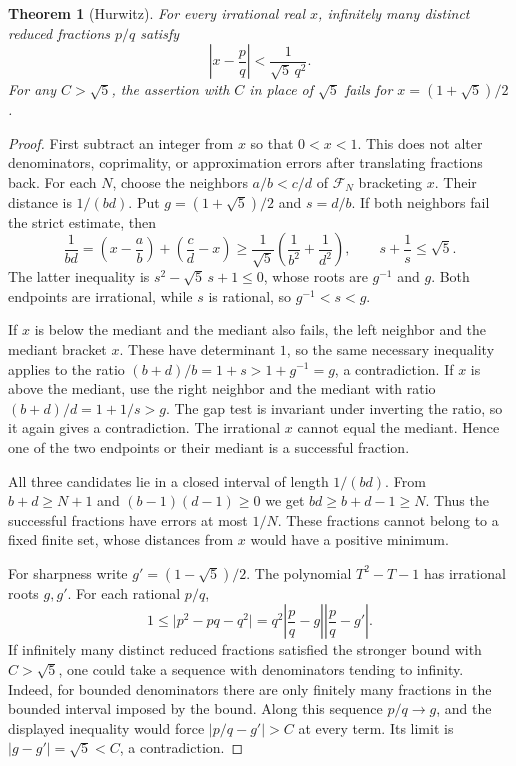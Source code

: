 \documentclass[11pt,oneside,openany]{book}
\theoremstyle{plain}
\newtheorem{theorem}{Theorem}[chapter]
\theoremstyle{definition}
\theoremstyle{remark}
\begin{document}
\begin{theorem}[Hurwitz]
For every irrational real \(x\), infinitely many distinct reduced
fractions \(p/q\) satisfy
\[
 \left|x-\frac pq\right|<\frac{1}{\sqrt5\,q^2}.
\]
For any \(C>\sqrt5\), the assertion with \(C\) in place of \(\sqrt5\)
fails for \(x=(1+\sqrt5)/2\).
\end{theorem}
\begin{proof}
First subtract an integer from \(x\) so that \(0<x<1\). This does not
alter denominators, coprimality, or approximation errors after
translating fractions back. For each \(N\), choose the neighbors
\(a/b<c/d\) of \(\mathcal F_N\) bracketing \(x\). Their distance is
\(1/(bd)\). Put \(g=(1+\sqrt5)/2\) and \(s=d/b\). If both neighbors
fail the strict estimate, then
\[
 \frac{1}{bd}
 =\left(x-\frac ab\right)+\left(\frac cd-x\right)
 \ge\frac1{\sqrt5}\left(\frac1{b^2}+\frac1{d^2}\right),
 \qquad
 s+\frac1s\le\sqrt5.
\]
The latter inequality is \(s^2-\sqrt5\,s+1\le0\), whose roots are
\(g^{-1}\) and \(g\). Both endpoints are irrational, while \(s\) is
rational, so \(g^{-1}<s<g\).

If \(x\) is below the mediant and the mediant also fails, the left
neighbor and the mediant bracket \(x\). These have determinant \(1\),
so the same necessary inequality applies to the ratio
\((b+d)/b=1+s>1+g^{-1}=g\), a contradiction. If \(x\) is above the
mediant, use the right neighbor and the mediant with ratio
\((b+d)/d=1+1/s>g\). The gap test is invariant under inverting the
ratio, so it again gives a contradiction. The irrational \(x\) cannot
equal the mediant. Hence one of the two endpoints or their mediant is
a successful fraction.

All three candidates lie in a closed interval of length \(1/(bd)\).
From \(b+d\ge N+1\) and \((b-1)(d-1)\ge0\) we get
\(bd\ge b+d-1\ge N\). Thus the successful fractions have errors at
most \(1/N\). These fractions cannot belong to a fixed finite set,
whose distances from \(x\) would have a positive minimum.

For sharpness write \(g'=(1-\sqrt5)/2\). The polynomial
\(T^2-T-1\) has irrational roots \(g,g'\). For each rational \(p/q\),
\[
 1\le \lvert p^2-pq-q^2\rvert
 =q^2\left|\frac pq-g\right|\left|\frac pq-g'\right|.
\]
If infinitely many distinct reduced fractions satisfied the stronger
bound with \(C>\sqrt5\), one could take a sequence with denominators
tending to infinity. Indeed, for bounded denominators there are only
finitely many fractions in the bounded interval imposed by the bound.
Along this sequence \(p/q\to g\), and the displayed inequality would
force \(\lvert p/q-g'\rvert>C\) at every term. Its limit is
\(\lvert g-g'\rvert=\sqrt5<C\), a contradiction.
\end{proof}
\end{document}
